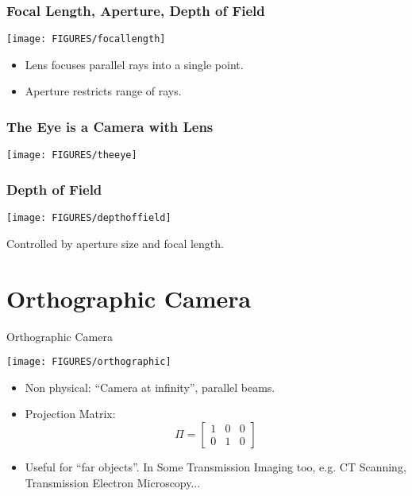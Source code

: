 \documentclass[9pt]{beamer}
\begin{document}
\begin{frame}
  \frametitle{Focal Length, Aperture, Depth of Field}
  \begin{center}
    \texttt{[image: FIGURES/focallength]}
  \end{center}
  \begin{itemize}
  \item Lens focuses parallel rays into a single point.
  \item Aperture restricts range of rays.
  \end{itemize}
\end{frame}


\begin{frame}
  \frametitle{The Eye is a Camera with Lens}
    \begin{center}
    \texttt{[image: FIGURES/theeye]}
  \end{center}
\end{frame}

\begin{frame}
  \frametitle{Depth of Field}
  \begin{center}
    \texttt{[image: FIGURES/depthoffield]}
  \end{center}
  Controlled by aperture size and focal length.
\end{frame}





\section{Orthographic Camera}

\begin{frame}[t]{Orthographic Camera}
  \begin{center}
    \texttt{[image: FIGURES/orthographic]}
  \end{center}
  \begin{itemize}
  \item Non physical: ``Camera at infinity'', parallel beams.
  \item Projection Matrix:
    $$
    \Pi =
    \begin{bmatrix}
      1 & 0 & 0\\
      0 & 1 & 0
    \end{bmatrix}
    $$
  \item Useful for ``far objects''. In Some Transmission Imaging too, e.g. CT Scanning, Transmission Electron Microscopy... 
  \end{itemize}
\end{frame}
\end{document}
